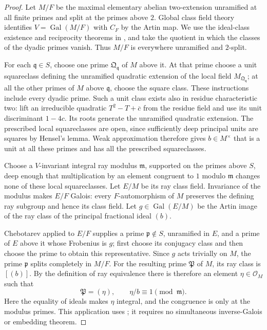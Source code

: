 \begin{proof}
Let $M/F$ be the maximal elementary abelian two-extension unramified
at all finite primes and split at the primes above $2$. Global class
field theory identifies $V=\operatorname{Gal}(M/F)$ with $C_F$ by
the Artin map. We use the ideal-class existence and reciprocity
theorems in \cite[Chapter V, Theorems 3.5--3.6, p.~158]{C_MilneCFT2020},
and take the quotient in which the classes of the dyadic primes
vanish. Thus $M/F$ is everywhere unramified and $2$-split.

For each $\mathfrak q\in S$, choose one prime
$\mathfrak Q_{\mathfrak q}$ of $M$ above it. At that prime choose
a unit squareclass defining the unramified quadratic extension of
the local field $M_{\mathfrak Q_{\mathfrak q}}$; at all the other
primes of $M$ above $\mathfrak q$, choose the square class.
These instructions include every dyadic prime. Such a unit class
exists also in residue characteristic two: lift an irreducible
quadratic $T^2-T+\overline c$ from the residue field and use its
unit discriminant $1-4c$. Its roots generate the unramified quadratic
extension. The prescribed local squareclasses are open, since
sufficiently deep principal units are squares by Hensel's lemma.
Weak approximation therefore gives $b\in M^\times$ that is a unit
at all these primes and has all the prescribed squareclasses.

Choose a $V$-invariant integral ray modulus $\mathfrak m$, supported
on the primes above $S$, deep enough that multiplication by an
element congruent to $1$ modulo $\mathfrak m$ changes none of these
local squareclasses. Let $E/M$ be its ray class field. Invariance
of the modulus makes $E/F$ Galois: every $F$-automorphism of $M$
preserves the defining ray subgroup and hence its class field.
Let $g\in\operatorname{Gal}(E/M)$ be the Artin image of the ray
class of the principal fractional ideal $(b)$.

Chebotarev applied to $E/F$ supplies a prime
$\mathfrak p\notin S$, unramified in $E$, and a prime of $E$ above
it whose Frobenius is $g$; first choose its conjugacy class and then
choose the prime to obtain this representative. Since $g$ acts
trivially on $M$, the prime $\mathfrak p$ splits completely in $M/F$.
For the resulting prime $\mathfrak P$ of $M$, its ray class is
$[(b)]$. By the definition of ray equivalence there is therefore
an element $\eta\in\mathcal O_M$ such that
\[
             \mathfrak P=(\eta),\qquad \eta/b\equiv1\pmod{\mathfrak m}.
\]
Here the equality of ideals makes $\eta$ integral, and the congruence
is only at the modulus primes. This application uses
\cite[Chapter V, Theorem 3.23, p.~164]{C_MilneCFT2020}; it requires
no simultaneous inverse-Galois or embedding theorem.


\end{proof}
